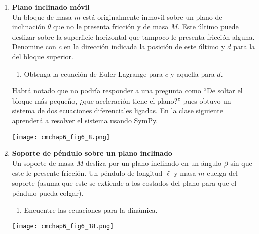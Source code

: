 \documentclass[11pt, a4paper, twoside]{article}
\begin{document}
\begin{enumerate}
\item
	\begin{minipage}[t][5.5cm]{0.7\textwidth}
		\textbf{Plano inclinado móvil}\\
		Un bloque de masa \(m\) está originalmente inmovil sobre un plano de inclinación \(\theta\) que no le presenta fricción y de masa \(M\).
		Este último puede deslizar sobre la superficie horizontal que tampoco le presenta fricción alguna.
		Denomine con \(c\) en la dirección indicada la posición de este último y \(d\) para la del bloque superior.
		\begin{enumerate}
			\item Obtenga la ecuación de Euler-Lagrange para \(c\) y aquella para \(d\).
		\end{enumerate}
		Habrá notado que no podría responder a una pregunta como ``De soltar el bloque más pequeño, ¿que aceleración tiene el plano?'' pues obtuvo un sistema de dos ecuaciones diferenciales ligadas.
		En la clase siguiente aprenderá a resolver el sistema usando SymPy. 
	\end{minipage}
	\begin{minipage}[c][0cm][t]{0.3\textwidth}
		\texttt{[image: cmchap6\_fig6\_8.png]}
	\end{minipage}


\item
	\begin{minipage}[t][4.5cm]{0.7\textwidth}
		\textbf{Soporte de péndulo sobre un plano inclinado}\\
		Un soporte de masa \(M\) desliza por un plano inclinado en un ángulo \(\beta\) sin que este le presente fricción.
		Un péndulo de longitud \(\ell\) y masa \(m\) cuelga del soporte (asuma que este se extiende a los costados del plano para que el péndulo pueda colgar).
		\begin{enumerate}
			\item Encuentre las ecuaciones para la dinámica.
		\end{enumerate}
	\end{minipage}
	\begin{minipage}[c][0cm][t]{0.3\textwidth}
		\texttt{[image: cmchap6\_fig6\_18.png]}
	\end{minipage}




\end{enumerate}
\end{document}

